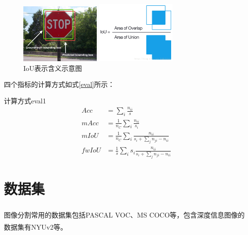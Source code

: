 \documentclass[cn]{elegantbook}
\newcommand{\upcite}[1]{\textsuperscript{\textsuperscript{\cite{#1}}}}
\begin{document}
\begin{figure}
	\centering
	\begin{minipage}[t]{0.45\textwidth}
		\centering
		\includegraphics[width=4cm]{images/IoU1.jpg}
	\end{minipage}
	\begin{minipage}[t]{0.45\textwidth}
		\centering
		\includegraphics[width=4cm]{images/IoU2.png}
	\end{minipage}
	\caption{\label{IoU}IoU表示含义示意图}
\end{figure}

四个指标的计算方式如式\ref{eval}所示：
\begin{definition}{计算方式}{eval1}
	\begin{equation}
	\label{eval}
	\begin{aligned}
	Acc &= \sum_{i}\frac{n_{ii}}{s} \\
	mAcc &= \frac{1}{n_C}\sum_{i}\frac{n_{ii}}{s_i} \\
	mIoU &= \frac{1}{n_C}\sum_{i}\frac{n_{ii}}{s_i+\sum_{j}n_{ji}-n_{ii}} \\
	fwIoU &= \frac{1}{s}\sum_{i}s_i\frac{n_{ii}}{s_i+\sum_{j}n_{ji}-n_{ii}}
	\end{aligned}
	\end{equation}
\end{definition}

\section{数据集}
图像分割常用的数据集包括PASCAL VOC\upcite{everingham2015pascal}、MS COCO\upcite{2014arXiv1405.0312L}等，包含深度信息图像的数据集有NYUv2\upcite{silberman2012indoor}等。
\end{document}
